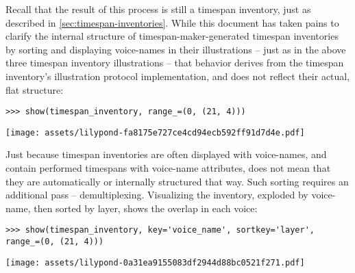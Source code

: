 \noindent Recall that the result of this process is still a timespan inventory,
just as described in \autoref{sec:timespan-inventories}. While this document
has taken pains to clarify the internal structure of timespan-maker-generated
timespan inventories by sorting and displaying voice-names in their
illustrations -- just as in the above three timespan inventory illustrations --
that behavior derives from the timespan inventory's illustration protocol
implementation, and does not reflect their actual, flat structure:

\begin{comment}
<abjad>
show(timespan_inventory, range_=(0, (21, 4)))
</abjad>
\end{comment}

\begin{abjadbookoutput}
\begin{singlespacing}
\vspace{-0.5\baselineskip}
\begin{verbatim}
>>> show(timespan_inventory, range_=(0, (21, 4)))
\end{verbatim}
\noindent\texttt{[image: assets/lilypond-fa8175e727ce4cd94ecb592ff91d7d4e.pdf]}
\end{singlespacing}
\end{abjadbookoutput}

\noindent Just because timespan inventories are often displayed with
voice-names, and contain performed timespans with voice-name attributes, does
not mean that they are automatically or internally structured that way. Such
sorting requires an additional pass -- demultiplexing. Visualizing the
inventory, exploded by voice-name, then sorted by layer, shows the overlap in
each voice:

\begin{comment}
<abjad>
show(timespan_inventory, key='voice_name', sortkey='layer', range_=(0, (21, 4)))
</abjad>
\end{comment}

\begin{abjadbookoutput}
\begin{singlespacing}
\vspace{-0.5\baselineskip}
\begin{verbatim}
>>> show(timespan_inventory, key='voice_name', sortkey='layer', range_=(0, (21, 4)))
\end{verbatim}
\noindent\texttt{[image: assets/lilypond-0a31ea9155083df2944d88bc0521f271.pdf]}
\end{singlespacing}
\end{abjadbookoutput}


